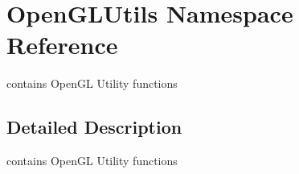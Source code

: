 \hypertarget{namespace_open_g_l_utils}{}\section{Open\+G\+L\+Utils Namespace Reference}
\label{namespace_open_g_l_utils}


contains Open\+GL Utility functions  




\subsection{Detailed Description}
contains Open\+GL Utility functions 